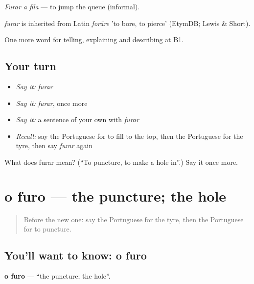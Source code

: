 \emph{Furar a fila} — to jump the queue (informal).

\begin{cousinweb}
\emph{furar} is inherited from Latin \emph{forāre} 'to bore, to pierce' (EtymDB; Lewis \& Short).
\end{cousinweb}

\begin{grammarlens}[title={What you've built}]
One more word for telling, explaining and describing at B1.
\end{grammarlens}

\subsection*{Your turn}
\begin{itemize}
\raggedright
  \item \emph{Say it:} \emph{furar}
  \item \emph{Say it:} \emph{furar}, once more
  \item \emph{Say it:} a sentence of your own with \emph{furar}
  \item \emph{Recall:} say the Portuguese for to fill to the top, then the Portuguese for the tyre, then say \emph{furar} again
\end{itemize}

\begin{tcolorbox}[breakable,colback=teal!4,colframe=teal!35!black,title={Before you move on}]
What does furar mean? (\textquotedblleft{}To puncture, to make a hole in\textquotedblright{}.) Say it once more.
\end{tcolorbox}
\section[o furo]{o furo — the puncture; the hole}

\label{lesson:PT-C405-furo}



\begin{quote}
Before the new one: say the Portuguese for the tyre, then the Portuguese for to puncture.
\end{quote}

\subsection*{You'll want to know: o furo}
\textbf{o furo} — \textquotedblleft{}the puncture; the hole\textquotedblright{}.

